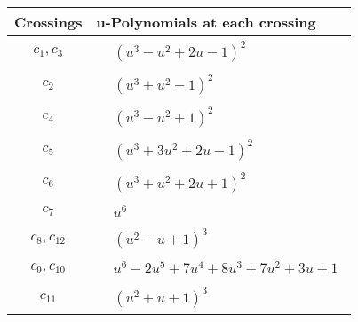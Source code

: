 \documentclass[1p]{elsarticle_modified}
\theoremstyle{definition}
\begin{document}
\begin{tabular}{m{50pt}|m{274pt}}
Crossings & \hspace{64pt}u-Polynomials at each crossing \\
\hline $$\begin{aligned}c_{1},c_{3}\end{aligned}$$&$\begin{aligned}
&(u^3- u^2+2 u-1)^2
\end{aligned}$\\
\hline $$\begin{aligned}c_{2}\end{aligned}$$&$\begin{aligned}
&(u^3+u^2-1)^2
\end{aligned}$\\
\hline $$\begin{aligned}c_{4}\end{aligned}$$&$\begin{aligned}
&(u^3- u^2+1)^2
\end{aligned}$\\
\hline $$\begin{aligned}c_{5}\end{aligned}$$&$\begin{aligned}
&(u^3+3 u^2+2 u-1)^2
\end{aligned}$\\
\hline $$\begin{aligned}c_{6}\end{aligned}$$&$\begin{aligned}
&(u^3+u^2+2 u+1)^2
\end{aligned}$\\
\hline $$\begin{aligned}c_{7}\end{aligned}$$&$\begin{aligned}
&u^6
\end{aligned}$\\
\hline $$\begin{aligned}c_{8},c_{12}\end{aligned}$$&$\begin{aligned}
&(u^2- u+1)^3
\end{aligned}$\\
\hline $$\begin{aligned}c_{9},c_{10}\end{aligned}$$&$\begin{aligned}
&u^6-2 u^5+7 u^4+8 u^3+7 u^2+3 u+1
\end{aligned}$\\
\hline $$\begin{aligned}c_{11}\end{aligned}$$&$\begin{aligned}
&(u^2+u+1)^3
\end{aligned}$\\
\hline
\end{tabular}\\~\\
\end{document}
